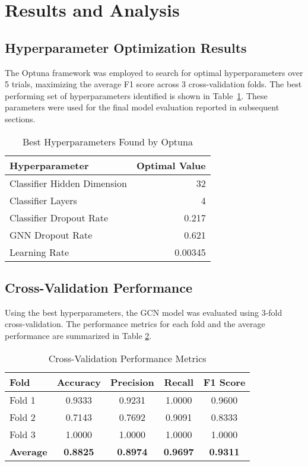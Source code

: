 \documentclass[sigplan,screen]{acmart}
\begin{document}
\section{Results and Analysis}
\subsection{Hyperparameter Optimization Results}
The Optuna framework was employed to search for optimal hyperparameters over 5 trials, maximizing the average F1 score across 3 cross-validation folds. The best performing set of hyperparameters identified is shown in Table~\ref{tab:best_hyperparams}. These parameters were used for the final model evaluation reported in subsequent sections.

\begin{table}[htbp] %
  \caption{Best Hyperparameters Found by Optuna}
  \label{tab:best_hyperparams}
  \centering
  \begin{tabular}{lr}
    \toprule
    Hyperparameter & Optimal Value \\
    \midrule
    Classifier Hidden Dimension & 32 \\
    Classifier Layers & 4 \\
    Classifier Dropout Rate & 0.217 \\
    GNN Dropout Rate & 0.621 \\
    Learning Rate & 0.00345 \\
  \bottomrule
\end{tabular}
\end{table}

\subsection{Cross-Validation Performance}
Using the best hyperparameters, the GCN model was evaluated using 3-fold cross-validation. The performance metrics for each fold and the average performance are summarized in Table \ref{tab:cv_results}.

\begin{table}[htbp] %
  \caption{Cross-Validation Performance Metrics}
  \label{tab:cv_results}
  \begin{tabular}{lcccc}
    \toprule
    Fold & Accuracy & Precision & Recall & F1 Score \\
    \midrule
    Fold 1 & 0.9333 & 0.9231 & 1.0000 & 0.9600 \\
    Fold 2 & 0.7143 & 0.7692 & 0.9091 & 0.8333 \\
    Fold 3 & 1.0000 & 1.0000 & 1.0000 & 1.0000 \\
    \midrule
    \textbf{Average} & \textbf{0.8825} & \textbf{0.8974} & \textbf{0.9697} & \textbf{0.9311} \\
  \bottomrule
\end{tabular}
\end{table}
\end{document}
